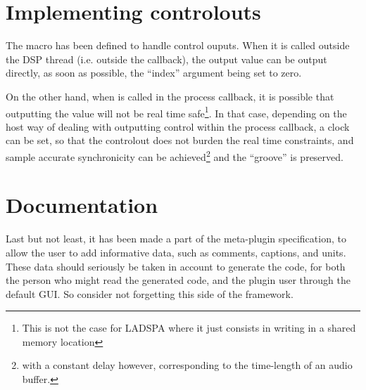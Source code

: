 \section{Implementing controlouts}
\label{controlout}
\noindent The macro  has been defined to
handle control ouputs. When it is called outside the DSP thread
(i.e. outside the  callback), the output value can be
output directly, as soon as possible, the ``index'' argument being set
to zero. 

\noindent On the other hand, when  is called
in the process callback, it is possible that outputting the value will
not be real time safe\footnote{This is not the case for LADSPA
  where it just consists in writing in a shared memory location}. In
that case, depending on the host way of dealing with outputting control
within the process callback, a clock can be set, so that the controlout 
does not burden the real time constraints, and sample accurate synchronicity
 can be achieved\footnote{with a constant delay however, corresponding
   to the time-length of an audio buffer.} and the ``groove'' is
 preserved.\\ 


\section{Documentation}
\noindent Last but not least, it has been made a part of the
meta-plugin specification, to allow the user to add informative data,
such as comments, captions, and units. These data should seriously be
taken in account to generate the code, for both the person who might
read the generated code, and the plugin user through the default
GUI. So consider not forgetting this side of the framework.\\ 

